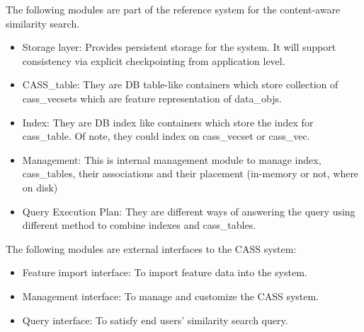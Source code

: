 The following modules are part of the reference system for the
content-aware similarity search.
\begin{itemize}
\item Storage layer: Provides persistent storage for the system. It
  will support consistency via explicit checkpointing from
  application level. 
\item CASS\_table: They are DB table-like containers which store
  collection of cass\_vecsets which are feature representation of data\_objs.
\item Index: They are DB index like containers which store the index
  for cass\_table. Of note, they could index on cass\_vecset or
  cass\_vec.
\item Management: This is internal management module to manage
  index, cass\_tables, their associations and their placement
  (in-memory or not, where on disk)
\item Query Execution Plan: They are different ways of answering the
  query using different method to combine indexes and
  cass\_tables.
\end{itemize}

The following modules are external interfaces to the CASS system:
\begin{itemize}
\item Feature import interface: To import feature data into the system. 
\item Management interface: To manage and customize the CASS system.
\item Query interface: To satisfy end users' similarity search query.
\end{itemize}



